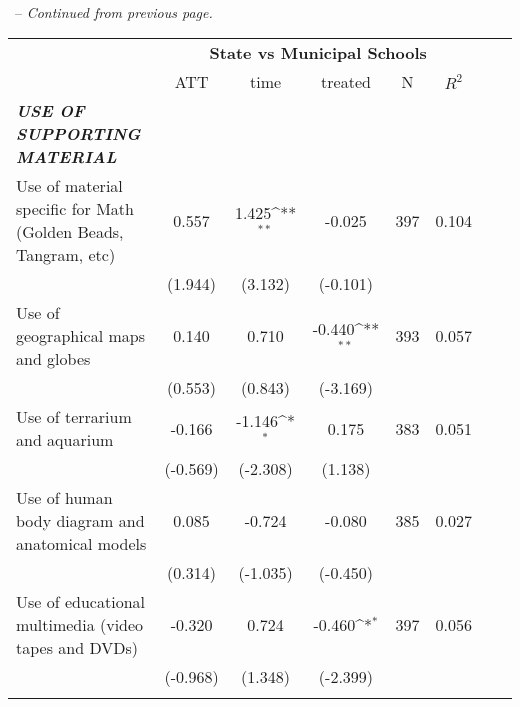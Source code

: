 \documentclass[a4paper, 12pt]{article}
\newcommand{\sym}[1]{\rlap{#1}}%
\begin{document}
{\vspace{50pt}
\tablename\ \addtocounter{table}{-1} \thetable\ -- \textit{Continued from previous page.}
\vspace{-10pt}
\begin{longtable}{@{\extracolsep{1pt}}l*{7}{c}@{}} 
\def\sym#1{\ifmmode^{#1}\else\(^{#1}\)\fi}
\begin{adjustbox}{max width=\textwidth}           
\begin{tabular}{l*{5}{c}}
\toprule
            &\multicolumn{5}{c}{\textbf{State vs Municipal Schools}}\\
 \cline{2-6}                    &\multicolumn{1}{c}{ATT}&\multicolumn{1}{c}{time}&\multicolumn{1}{c}{treated}&\multicolumn{1}{c}{N}&\multicolumn{1}{c}{$R^2$}\\
\midrule
\textbf{\emph{USE OF SUPPORTING MATERIAL}}&            &            &            &                     &               \\
Use of material specific for Math (Golden Beads, Tangram, etc)     &       0.557         &       1.425\sym{**} &     -0.025         &     397         &      0.104        \\
            &     (1.944)         &     (3.132)         &     (-0.101)         &              &              \\
Use of geographical maps and globes     &       0.140         &       0.710         &      -0.440\sym{**} &    393         &      0.057         \\
            &     (0.553)         &     (0.843)         &     (-3.169)         &             &              \\
Use of terrarium and aquarium     &      -0.166         &      -1.146\sym{*}  &       0.175         &   383     &   0.051            \\
            &     (-0.569)         &     (-2.308)         &     (1.138)         &              &              \\
Use of human body diagram and anatomical models     &      0.085         &      -0.724         &     -0.080         &     385         &     0.027         \\
            &     (0.314)         &     (-1.035)         &     (-0.450)         &             &              \\
Use of educational multimedia (video tapes and DVDs)     &      -0.320         &       0.724         &      -0.460\sym{*}  &     397         &     0.056         \\
            &     (-0.968)         &     (1.348)         &     (-2.399)         &              &              \\

\end{tabular}
\end{adjustbox}
\end{longtable}}
\end{document}
